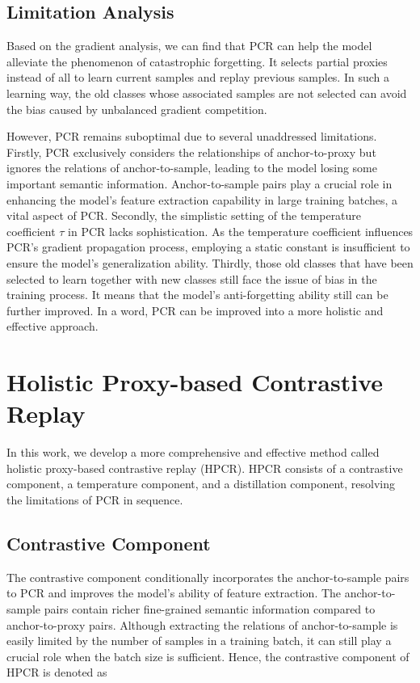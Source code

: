 \subsection{Limitation Analysis}
Based on the gradient analysis, we can find that PCR can help the model alleviate the phenomenon of catastrophic forgetting. It selects partial proxies instead of all to learn current samples and replay previous samples. In such a learning way, the old classes whose associated samples are not selected can avoid the bias caused by unbalanced gradient competition.

However, PCR remains suboptimal due to several unaddressed limitations. Firstly, PCR exclusively considers the relationships of anchor-to-proxy but ignores the relations of anchor-to-sample, leading to the model losing some important semantic information. Anchor-to-sample pairs play a crucial role in enhancing the model's feature extraction capability in large training batches, a vital aspect of PCR. Secondly, the simplistic setting of the temperature coefficient $\tau$ in PCR lacks sophistication. As the temperature coefficient influences PCR's gradient propagation process, employing a static constant is insufficient to ensure the model's generalization ability. Thirdly, those old classes that have been selected to learn together with new classes still face the issue of bias in the training process. It means that the model's anti-forgetting ability still can be further improved. In a word, PCR can be improved into a more holistic and effective approach.

\section{Holistic Proxy-based Contrastive Replay}
\label{sec:PCR+}
In this work, we develop a more comprehensive and effective method called holistic proxy-based contrastive replay (HPCR). HPCR consists of a contrastive component, a temperature component, and a distillation component, resolving the limitations of PCR in sequence. 

\subsection{Contrastive Component}
 The contrastive component conditionally incorporates the anchor-to-sample pairs to PCR and improves the model's ability of feature extraction. The anchor-to-sample pairs contain richer fine-grained semantic information compared to anchor-to-proxy pairs. Although extracting the relations of anchor-to-sample is easily limited by the number of samples in a training batch, it can still play a crucial role when the batch size is sufficient. Hence, the contrastive component of HPCR is denoted as 

